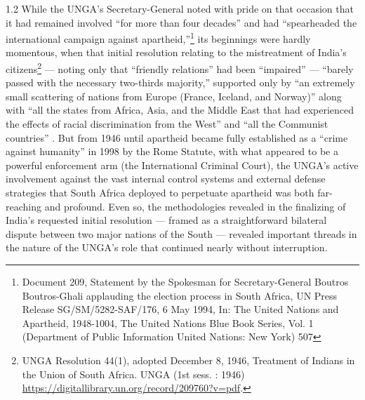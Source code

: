 \documentclass[../unravbook.tex]{subfiles}
\begin{document}
\begin{spacing}{1.2}
While the UNGA's Secretary-General noted with pride on that occasion that it had remained involved \enquote{for more than four decades} and had \enquote{spearheaded the international campaign against apartheid,}\footnote{Document 209, Statement by the Spokesman for Secretary-General Boutros Boutros-Ghali applauding the election process in South Africa, UN Press Release SG/SM/5282-SAF/176, 6 May 1994, In: The United Nations and Apartheid, 1948-1004, The United Nations Blue Book Series, Vol. 1 (Department of Public Information United Nations: New York) 507} its beginnings were hardly momentous, when that initial resolution relating to the mistreatment of India's citizens\footnote{UNGA Resolution 44(1), adopted December 8, 1946, Treatment of Indians in the Union of South Africa. UNGA (1st sess. : 1946) \url{https://digitallibrary.un.org/record/209760?v=pdf}.} --- noting only that \enquote{friendly relations} had been \enquote{impaired} --- ``barely passed with the necessary two-thirds majority,'' supported only by \enquote{an extremely small scattering of nations from Europe (France, Iceland, and Norway)} along with \enquote{all the states from Africa, Asia, and the Middle East that had experienced the effects of racial discrimination from the West} and \enquote{all the Communist countries} \parencite[171]{Lauren-1988}.  But from 1946 until apartheid became fully established as a \enquote{crime against humanity} in 1998 by the Rome Statute, with what appeared to be a powerful enforcement arm (the International Criminal Court), the UNGA's active involvement against the vast internal control systems and external defense strategies that South Africa deployed to perpetuate apartheid was both far-reaching and profound. Even so, the methodologies revealed in the finalizing of India's requested initial resolution  --- framed as a straightforward bilateral dispute between two major nations of the South --- revealed important threads in the nature of the UNGA's role that continued nearly without interruption. 


\end{spacing}
\end{document}
